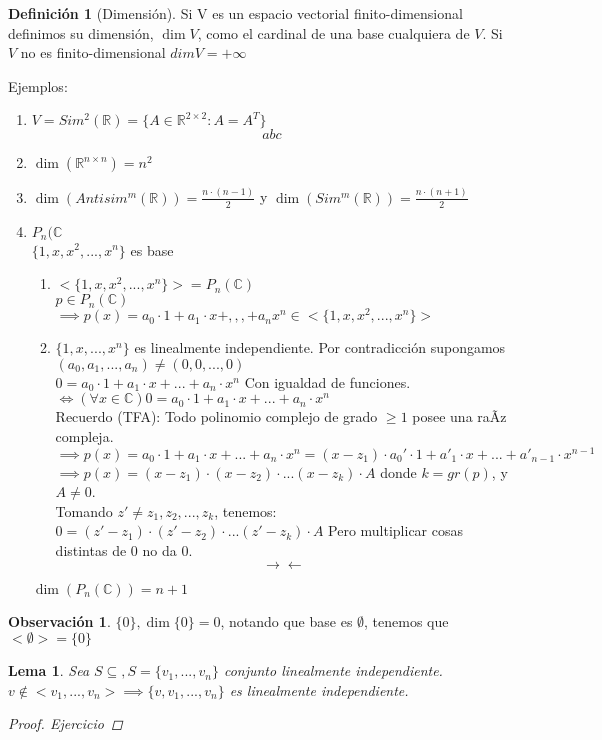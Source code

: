 \documentclass[11pt]{book}
\newtheorem{lem}[thm]{Lema}
\theoremstyle{definition}
\newtheorem{defn}{Definición}[section]
\newtheorem{obs}{Observación}[section]
\begin{document}
\begin{defn}[Dimensión]
Si V es un espacio vectorial finito-dimensional definimos su dimensión, $\dim V$, como el cardinal de una base cualquiera de $V$. Si $V$ no es finito-dimensional $dimV=+\infty$
\end{defn}
Ejemplos:
\begin{enumerate}
	\item $V=Sim^2(\mathbb{R})=\{A\in\mathbb{R}^{2\times 2}:A=A^T\}$
	\[
	abc
	\]
	
	\item $\dim(\mathbb{R}^{n\times n})=n^2$
	
	\item $\dim(Antisim^m(\mathbb{R}))=\frac{n\cdot(n-1)}{2}$ y $\dim(Sim^m(\mathbb{R}))=\frac{n\cdot (n+1)}{2}$
	
	\item$P_n(\mathbb{C}$\\
	$\{1,x,x^2,...,x^n\}$ es base
	\begin{enumerate}
		\item $<\{1,x,x^2,...,x^n\}>=P_n(\mathbb{C})$\\
		$p\in P_n(\mathbb{C})$\\
		$\implies p(x)=a_0\cdot 1+a_1\cdot x+,,,+a_nx^n\in<\{1,x,x^2,...,x^n\}>$
		
		\item $\{1,x,...,x^n\}$ es linealmente independiente. Por contradicción supongamos $(a_0,a_1,...,a_n)\neq (0,0,...,0)$\\
		$0=a_0\cdot 1+a_1\cdot x+...+a_n\cdot x^n$ Con igualdad de funciones.\\
		$\iff (\forall x\in \mathbb{C}) 0=a_0\cdot 1+a_1\cdot x+...+a_n\cdot x^n$\\
		Recuerdo (TFA): Todo polinomio complejo de grado $\geq 1$ posee una raÃ­z compleja.\\
		$\implies p(x)=a_0\cdot 1+a_1\cdot x+...+a_n\cdot x^n=(x-z_1)\cdot a_0'\cdot 1+a'_1\cdot x+...+a'_{n-1}\cdot x^{n-1}$\\
		$\implies p(x)=(x-z_1)\cdot (x-z_2)\cdot...(x-z_k)\cdot A$ donde $k=gr(p)$, y $A\neq 0$.\\
		Tomando $z'\neq z_1,z_2,...,z_k$, tenemos: $0=(z'-z_1)\cdot (z'-z_2)\cdot...(z'-z_k)\cdot A$ Pero multiplicar cosas distintas de $0$ no da $0$.
		\[
		\rightarrow\leftarrow
		\]
	\end{enumerate}
	$\dim(P_n(\mathbb{C}))=n+1$
\end{enumerate}

\begin{obs}
$\{0\}, \dim\{0\}=0$, notando que base es $\emptyset$, tenemos que $<\emptyset>=\{0\}$
\end{obs}
\begin{lem}
Sea $S\subseteq , S=\{v_1,...,v_n\}$ conjunto linealmente independiente.\\
$v\notin<v_1,...,v_n>\implies\{v,v_1,...,v_n\}$ es linealmente independiente.\\
\begin{proof}
Ejercicio
\end{proof}
\end{lem}
\end{document}
